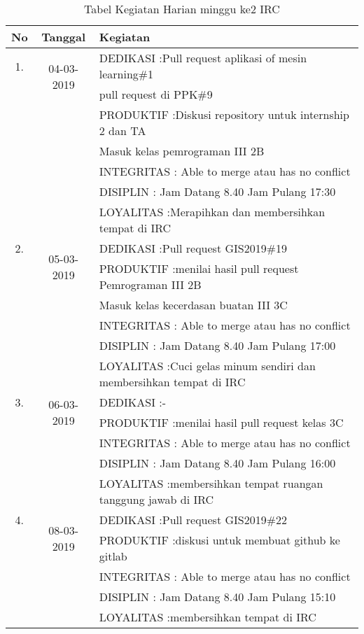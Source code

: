 \begin{table}[h]
\caption{Tabel Kegiatan Harian minggu ke2 IRC}
\centering
\begin{tabular}{|c|c|l|}
\hline
No&Tanggal&Kegiatan\\
\hline
1.&\multirow{2}{*}{04-03-2019}
&DEDIKASI :Pull request aplikasi of mesin learning\#1\\
		&&pull request di PPK\#9 \\
&&PRODUKTIF :Diskusi repository untuk internship 2 dan TA\\
		     &&Masuk kelas pemrograman III 2B\\
&&INTEGRITAS : Able to merge atau has no conflict\\
&&DISIPLIN : Jam Datang 8.40 Jam Pulang 17:30\\
&&LOYALITAS :Merapihkan dan membersihkan tempat di IRC\\
\hline
2.&\multirow{2}{*}{05-03-2019}
&DEDIKASI :Pull request GIS2019\#19\\
&&PRODUKTIF :menilai hasil pull request Pemrograman III 2B\\
		     &&Masuk kelas kecerdasan buatan III 3C\\
&&INTEGRITAS : Able to merge atau has no conflict\\
&&DISIPLIN : Jam Datang 8.40 Jam Pulang 17:00\\
&&LOYALITAS :Cuci gelas minum sendiri dan membersihkan tempat di IRC\\
\hline
3.&\multirow{2}{*}{06-03-2019}
&DEDIKASI :-\\
&&PRODUKTIF :menilai hasil pull request kelas 3C\\
&&INTEGRITAS : Able to merge atau has no conflict\\
&&DISIPLIN : Jam Datang 8.40 Jam Pulang 16:00\\
&&LOYALITAS :membersihkan tempat ruangan tanggung jawab di IRC\\
\hline
4.&\multirow{2}{*}{08-03-2019}
&DEDIKASI :Pull request GIS2019\#22\\
&&PRODUKTIF :diskusi untuk membuat github ke gitlab\\
&&INTEGRITAS : Able to merge atau has no conflict\\
&&DISIPLIN : Jam Datang 8.40 Jam Pulang 15:10\\
&&LOYALITAS :membersihkan tempat di IRC\\
\hline
\end{tabular}
\label{table:contoh}
\end{table}

